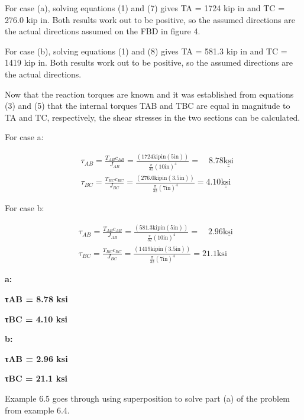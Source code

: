 \documentclass[
  letterpaper,
  DIV=11,
  numbers=noendperiod]{scrreprt}
\begin{document}
\begin{tcolorbox}
\begin{tcolorbox}
For case (a), solving equations (1) and (7) gives TA = 1724 kip in and
TC = 276.0 kip in. Both results work out to be positive, so the assumed
directions are the actual directions assumed on the FBD in figure 4.

For case (b), solving equations (1) and (8) gives TA = 581.3 kip in and
TC = 1419 kip in. Both results work out to be positive, so the assumed
directions are the actual directions.

Now that the reaction torques are known and it was established from
equations (3) and (5) that the internal torques TAB and TBC are equal in
magnitude to TA and TC, respectively, the shear stresses in the two
sections can be calculated.

For case a:

\[
\begin{aligned}
& \tau_{A B}=\frac{T_{A B} c_{A B}}{J_{A B}}=\frac{(1724 \mathrm{kip} \mathrm{in}(5 \mathrm{in}))}{\frac{\pi}{32}(10 \mathrm{in})^4}=\quad 8.78 \underline{\underline{\mathrm{ksi}}} \\
& \tau_{B C}=\frac{T_{B C} c_{B C}}{J_{B C}}=\frac{(276.0 \mathrm{kip} \mathrm{in}(3.5 \mathrm{in}))}{\frac{\pi}{32}(7 \mathrm{in})^4}=4.10 \underline{\underline{\mathrm{ksi}}}
\end{aligned}
\]

For case b:

\[
\begin{aligned}
& \tau_{A B}=\frac{T_{A B} c_{A B}}{J_{A B}}=\frac{(581.3 \mathrm{kip} \mathrm{in}(5 \mathrm{in}))}{\frac{\pi}{32}(10 \mathrm{in})^4}=\quad 2.96 \mathrm{\underline { \textrm {ksi } }} \\
& \tau_{B C}=\frac{T_{B C} c_{B C}}{J_{B C}}=\frac{(1419 \mathrm{kip} \mathrm{in}(3.5 \mathrm{in}))}{\frac{\pi}{32}(7 \mathrm{in})^4}=21.1 \mathrm{ksi}
\end{aligned}
\]

\textbf{a:}

\textbf{τAB = 8.78 ksi}

\textbf{τBC = 4.10 ksi}

\textbf{b:}

\textbf{τAB = 2.96 ksi}

\textbf{τBC = 21.1 ksi}

\end{tcolorbox}

\end{tcolorbox}

Example 6.5 goes through using superposition to solve part (a) of the
problem from example 6.4.
\end{document}
